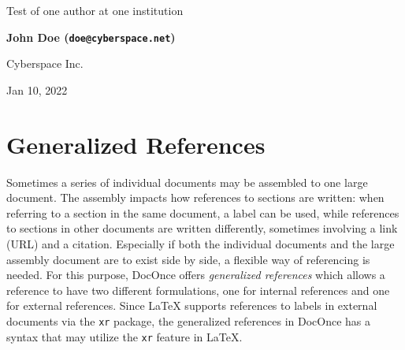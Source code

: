 \documentclass[%
oneside,                 %
final,                   %
chapterprefix=true,      %
open=right,              %
10pt]{book}
\begin{document}

\newcommand{\exercisesection}[1]{\subsection*{#1}}








\thispagestyle{empty}

\begin{center}
{\LARGE\bf
\begin{spacing}{1.25}
Test of one author at one institution
\end{spacing}
}
\end{center}


\begin{center}
{\bf John Doe (\texttt{doe@cyberspace.net})}
\end{center}

    \begin{center}
\centerline{{\small Cyberspace Inc.}}
\end{center}
    

\begin{center}
Jan 10, 2022
\end{center}

\vspace{1cm}



\chapter{Generalized References}
\label{genrefs}

Sometimes a series of individual documents may be assembled to one
large document. The assembly impacts how references to sections
are written: when referring to a section in the same document, a label
can be used, while references to sections in other documents are
written differently, sometimes involving a link (URL) and a citation.
Especially if both the individual documents and the large assembly document
are to exist side by side, a flexible way of referencing is needed.
For this purpose, DocOnce offers \emph{generalized references} which allows
a reference to have two different formulations, one for internal
references and one for external references. Since {\LaTeX} supports
references to labels in external documents via the \texttt{xr} package,
the generalized references in DocOnce has a syntax that may utilize
the \texttt{xr} feature in {\LaTeX}.
\end{document}
